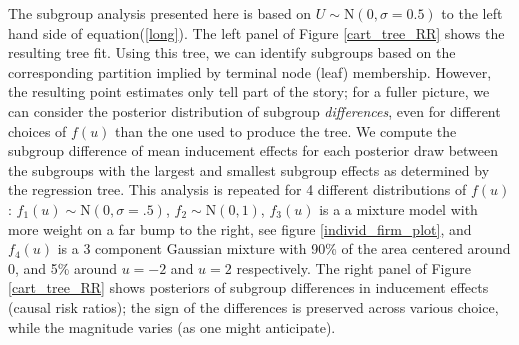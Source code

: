 \documentclass[aoas,preprint, 11pt, dvipsnames, table, x11name]{imsart}
\newcommand{\N}{\mbox{N}}
\theoremstyle{remark}
\begin{document}
The subgroup analysis presented here is based on $U \sim \N(0, \sigma=0.5)$ to the left hand side of equation(\ref{long}). The left panel of Figure \ref{cart_tree_RR} shows the resulting tree fit. Using this tree, we can identify subgroups based on the corresponding partition implied by terminal node (leaf) membership. However, the resulting point estimates only tell part of the story; for a fuller picture, we can consider the posterior distribution of subgroup {\em differences}, even for different choices of $f(u)$ than the one used to produce the tree.  We compute the subgroup difference of mean inducement effects for each posterior draw between the subgroups with the largest and smallest subgroup effects as determined by the regression tree.  This analysis is repeated for 4 different distributions of $f(u)$: $f_1(u)\sim \N(0,\sigma=.5)$, $f_2\sim \N(0,1)$, $f_3(u)$  is a a mixture model with more weight on a far bump to the right, see figure \ref{individ_firm_plot}, and $f_4(u)$ is a 3 component Gaussian mixture with 90\% of the area centered around 0, and 5\% around $u=-2$ and $u=2$ respectively. The right panel of Figure \ref{cart_tree_RR} shows posteriors of subgroup differences in inducement effects (causal risk ratios); the sign of the differences is preserved across various choice, while the magnitude varies (as one might anticipate).
\end{document}
